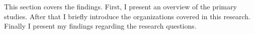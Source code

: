 This section covers the findings. First, I present an overview of the primary
studies. After that I briefly introduce the organizations covered in this
research. Finally I present my findings regarding the research questions.
